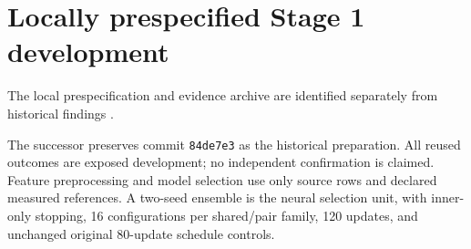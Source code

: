 \section{Locally prespecified Stage 1 development}

The local prespecification and evidence archive are identified separately from historical findings \citep{opalstage12026}.

The successor preserves commit \texttt{84de7e3} as the historical preparation. All reused outcomes are exposed development; no independent confirmation is claimed. Feature preprocessing and model selection use only source rows and declared measured references. A two-seed ensemble is the neural selection unit, with inner-only stopping, 16 configurations per shared/pair family, 120 updates, and unchanged original 80-update schedule controls.

